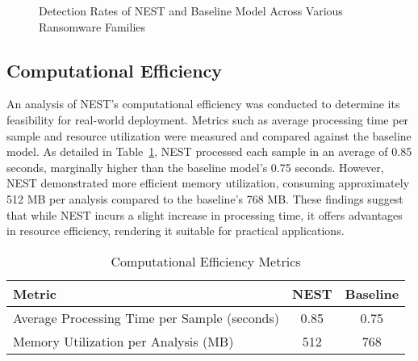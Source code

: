 \documentclass[lettersize,journal]{IEEEtran}
\begin{document}
\begin{figure}[h]
	\centering
	\caption{Detection Rates of NEST and Baseline Model Across Various Ransomware Families}
	\label{fig:detection_rates}
\end{figure}

\subsection{Computational Efficiency}

An analysis of NEST's computational efficiency was conducted to determine its feasibility for real-world deployment. Metrics such as average processing time per sample and resource utilization were measured and compared against the baseline model. As detailed in Table~\ref{tab:computational_efficiency}, NEST processed each sample in an average of 0.85 seconds, marginally higher than the baseline model's 0.75 seconds. However, NEST demonstrated more efficient memory utilization, consuming approximately 512 MB per analysis compared to the baseline's 768 MB. These findings suggest that while NEST incurs a slight increase in processing time, it offers advantages in resource efficiency, rendering it suitable for practical applications.

\begin{table}[h]
	\centering
	\caption{Computational Efficiency Metrics}
	\label{tab:computational_efficiency}
	\begin{tabular}{|l|c|c|}
		\hline
		\textbf{Metric} & \textbf{NEST} & \textbf{Baseline} \\
		\hline
		Average Processing Time per Sample (seconds) & 0.85 & 0.75 \\
		Memory Utilization per Analysis (MB) & 512 & 768 \\
		\hline
	\end{tabular}
\end{table}
\end{document}

